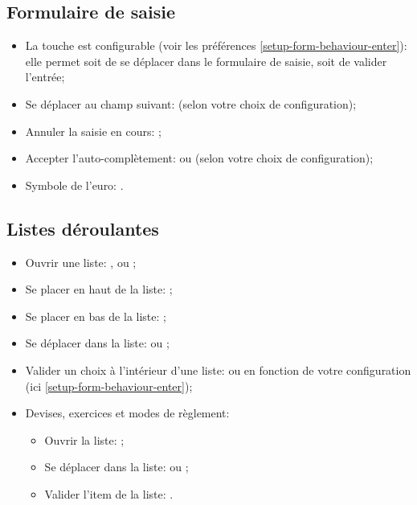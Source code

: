 \subsection{Formulaire de saisie }

\begin{itemize}
	\item La touche  est configurable (voir les préférences \vref{setup-form-behaviour-enter}): elle permet soit de se déplacer dans le formulaire de saisie, soit de valider l'entrée;
	\item Se déplacer au champ suivant:  (selon votre choix de configuration);
	\item Annuler la saisie en cours: \keys{\esc};
	\item Accepter l'auto-complètement:  ou  (selon votre choix de configuration);
	\item Symbole de l'euro: .
\end{itemize}


\subsection{Listes déroulantes}

\begin{itemize}
	\item Ouvrir une liste: ,  ou \keys{\arrowkeydown};
	\item Se placer en haut de la liste: ;
	\item Se placer en bas de la liste: ;
	\item Se déplacer dans la liste: \keys{\arrowkeyup} ou \keys{\arrowkeydown};
	\item Valider un choix à l'intérieur d'une liste:  ou  en fonction de votre configuration (ici \vref{setup-form-behaviour-enter});
	\item Devises, exercices et modes de règlement:
		\begin{itemize}
			\item Ouvrir la liste: ; 
			\item Se déplacer dans la liste: \keys{\arrowkeyup} ou \keys{\arrowkeydown};
			\item Valider l'item de la liste: .
		\end{itemize}
\end{itemize}


